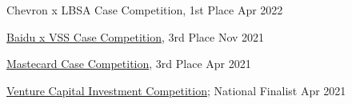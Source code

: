 Chevron x LBSA Case Competition, 1st Place \hfill Apr 2022\par
\href{https://www.facebook.com/events/1218686891977031}{Baidu x VSS Case Competition}, 3rd Place \hfill Nov 2021\par
\href{https://www.facebook.com/groups/892224561557976}{Mastecard Case Competition}, 3rd Place \hfill Apr 2021\par
\href{https://www.vcic.org/}{Venture Capital Investment Competition}; National Finalist \hfill Apr 2021\par